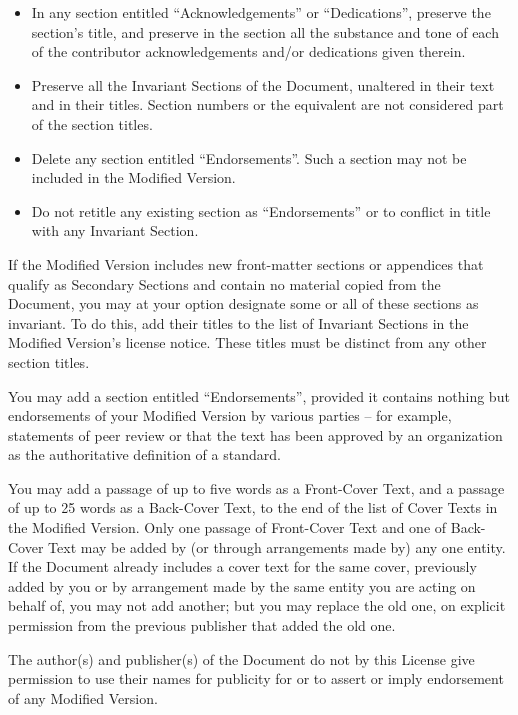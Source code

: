 \begin{itemize}
   least four years before the Document itself, or if the original
   publisher of the version it refers to gives permission.
\item In any section entitled ``Acknowledgements'' or ``Dedications'',
   preserve the section's title, and preserve in the section all the
   substance and tone of each of the contributor acknowledgements
   and/or dedications given therein.
\item Preserve all the Invariant Sections of the Document,
   unaltered in their text and in their titles.  Section numbers
   or the equivalent are not considered part of the section titles.
\item Delete any section entitled ``Endorsements''.  Such a section
   may not be included in the Modified Version.
\item Do not retitle any existing section as ``Endorsements''
   or to conflict in title with any Invariant Section.

\end{itemize}

If the Modified Version includes new front-matter sections or
appendices that qualify as Secondary Sections and contain no material
copied from the Document, you may at your option designate some or all
of these sections as invariant.  To do this, add their titles to the
list of Invariant Sections in the Modified Version's license notice.
These titles must be distinct from any other section titles.

You may add a section entitled ``Endorsements'', provided it contains
nothing but endorsements of your Modified Version by various
parties -- for example, statements of peer review or that the text has
been approved by an organization as the authoritative definition of a
standard.

You may add a passage of up to five words as a Front-Cover Text, and a
passage of up to 25 words as a Back-Cover Text, to the end of the list
of Cover Texts in the Modified Version.  Only one passage of
Front-Cover Text and one of Back-Cover Text may be added by (or
through arrangements made by) any one entity.  If the Document already
includes a cover text for the same cover, previously added by you or
by arrangement made by the same entity you are acting on behalf of,
you may not add another; but you may replace the old one, on explicit
permission from the previous publisher that added the old one.

The author(s) and publisher(s) of the Document do not by this License
give permission to use their names for publicity for or to assert or
imply endorsement of any Modified Version.


